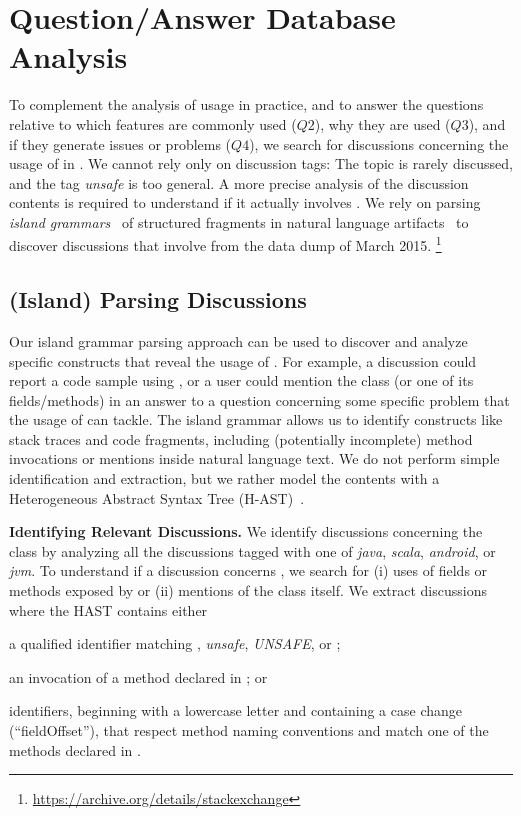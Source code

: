 \section{Question/Answer Database Analysis}\label{sec:unsafe:so}

To complement the analysis of \smu{} usage in practice,
and to answer the questions relative to which features are commonly used ($Q2$),
why they are used ($Q3$),
and if they generate issues or problems ($Q4$),
we search for discussions concerning the usage of \smu{} in \stackoverflow{}.
We cannot rely only on \stackoverflow{} discussion tags:
The topic is rarely discussed,
and the tag \emph{unsafe} is too general.
A more precise analysis of the discussion contents is required to understand if it actually involves \smu{}.
We rely on parsing \emph{island grammars}~\cite{Moon2001a} of structured fragments in natural language artifacts~\cite{Bacc2011f,Ponz2015a} to discover discussions that involve \smu{} from the \stackoverflow{} data dump of March 2015.%
\footnote{\url{https://archive.org/details/stackexchange}}

\subsection{(Island) Parsing \stackoverflow{} Discussions}

Our island grammar parsing approach can be used to discover and analyze specific constructs that reveal the usage of \smu{}.
For example, a discussion could report a code sample using \smu{},
or a user could mention the class (or one of its fields/methods) in an answer to a question concerning some specific problem that the usage of \smu{} can tackle.
The island grammar allows us to identify constructs like stack traces and \java{} code fragments,
including (potentially incomplete) method invocations or mentions inside natural language text.
We do not perform simple identification and extraction,
but we rather model the contents with a Heterogeneous Abstract Syntax Tree (H-AST)~\cite{Ponz2015a}.

\textbf{Identifying Relevant Discussions.}
We identify \stackoverflow{} discussions concerning the \smu{} class by analyzing all the discussions tagged with one of \emph{java}, \emph{scala}, \emph{android}, or \emph{jvm}.
To understand if a discussion concerns \smu{}, we search for
(i) uses of fields or methods exposed by \unsafe{} or
(ii) mentions of the class itself.
We extract discussions where the HAST contains either
\begin{inparaenum}[(i)]
\item a qualified identifier matching  \unsafe{}, \emph{unsafe}, \emph{UNSAFE}, or \smu{};
\item an invocation of a method declared in \smu; or
\item \java{} identifiers, beginning with a lowercase letter and containing a case change (\eg ``fieldOffset''), that respect method naming conventions and match one of the methods declared in \unsafe{}.
\end{inparaenum}

